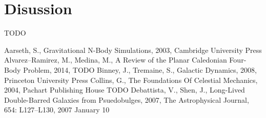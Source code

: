 \documentclass[a4paper,12pt]{article}
\begin{document}
\newpage
\section{Disussion}
TODO

\newpage
\begin{thebibliography}{1}
Aarseth, S., Gravitational N-Body Simulations, 2003, Cambridge University Press
Alvarez–Ramirez, M., Medina, M., A Review of the Planar Caledonian Four-Body Problem, 2014, TODO
Binney, J., Tremaine, S., Galactic Dynamics, 2008, Princeton University Press
Collins, G., The Foundations Of Celestial Mechanics, 2004, Pachart Publishing House TODO
Debattista, V., Shen, J., Long-Lived Double-Barred Galaxies from Psuedobulges, 2007, The Astrophysical Journal, 654: L127–L130, 2007 January 10


\end{thebibliography}
\end{document}
